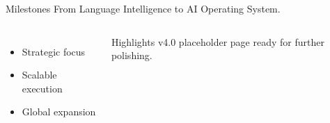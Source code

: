 
\begin{frame}{Milestones}
\vspace{0.3cm}
{\large From Language Intelligence to AI Operating System.}

\vspace{0.6cm}
\begin{columns}[T]
\begin{itemize}
\item Strategic focus
\item Scalable execution
\item Global expansion
\end{itemize}
\begin{block}{Highlights}
v4.0 placeholder page ready for further polishing.
\end{block}
\end{columns}
\end{frame}
